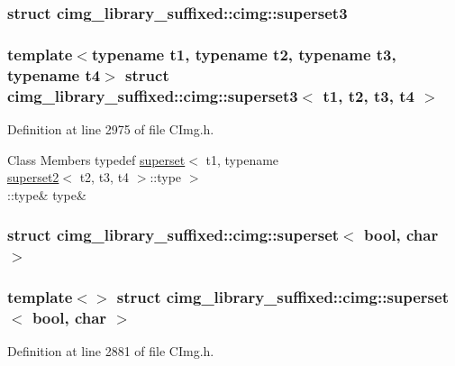 \subsubsection{struct cimg\+\_\+library\+\_\+suffixed\+:\+:cimg\+:\+:superset3}
\subsubsection*{template$<$typename t1, typename t2, typename t3, typename t4$>$\newline
struct cimg\+\_\+library\+\_\+suffixed\+::cimg\+::superset3$<$ t1, t2, t3, t4 $>$}



Definition at line 2975 of file C\+Img.\+h.

\begin{DoxyFields}{Class Members}
\mbox{\label{namespacecimg__library__suffixed_1_1cimg_aba013dc2009712d23706ccbfc3ba326c}} 
typedef \hyperlink{namespacecimg__library__suffixed_1_1cimg_d5/d9e/structcimg__library__suffixed_1_1cimg_1_1superset}{superset}$<$ t1, typename \\
\hyperlink{namespacecimg__library__suffixed_1_1cimg_d3/d82/structcimg__library__suffixed_1_1cimg_1_1superset2}{superset2}$<$ t2, t3, t4 $>$::type $>$\\
::type&
type&
\\
\hline

\end{DoxyFields}
\label{structcimg__library__suffixed_1_1cimg_1_1superset_3_01bool_00_01char_01_4}
\subsubsection{struct cimg\+\_\+library\+\_\+suffixed\+:\+:cimg\+:\+:superset$<$ bool, char $>$}
\subsubsection*{template$<$$>$\newline
struct cimg\+\_\+library\+\_\+suffixed\+::cimg\+::superset$<$ bool, char $>$}



Definition at line 2881 of file C\+Img.\+h.

